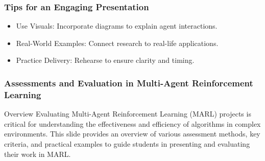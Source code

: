 \documentclass[aspectratio=169]{beamer}
\begin{document}
\begin{frame}
    \frametitle{Tips for an Engaging Presentation}
    \begin{itemize}
        \item Use Visuals: Incorporate diagrams to explain agent interactions.
        \item Real-World Examples: Connect research to real-life applications.
        \item Practice Delivery: Rehearse to ensure clarity and timing.
    \end{itemize}
\end{frame}

\begin{frame}[fragile]
    \frametitle{Assessments and Evaluation in Multi-Agent Reinforcement Learning}
    \begin{block}{Overview}
        Evaluating Multi-Agent Reinforcement Learning (MARL) projects is critical for understanding the effectiveness and efficiency of algorithms in complex environments. This slide provides an overview of various assessment methods, key criteria, and practical examples to guide students in presenting and evaluating their work in MARL.
    \end{block}
\end{frame}
\end{document}
